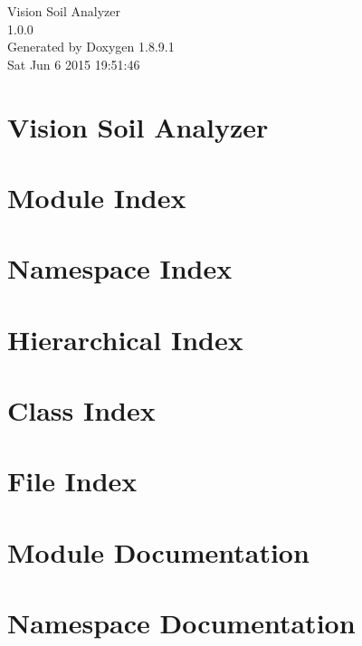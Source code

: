 \documentclass[twoside]{book}
\newcommand{\+}{\discretionary{\mbox{\scriptsize$\hookleftarrow$}}{}{}}
\newcommand{\clearemptydoublepage}{%
  \newpage{\pagestyle{empty}\cleardoublepage}%
}
\begin{document}
\hypersetup{pageanchor=false,
             bookmarks=true,
             bookmarksnumbered=true,
             pdfencoding=unicode
            }
\begin{titlepage}
\vspace*{7cm}
\begin{center}%
{\Large Vision Soil Analyzer \\[1ex]\large 1.\+0.\+0 }\\
\vspace*{1cm}
{\large Generated by Doxygen 1.8.9.1}\\
\vspace*{0.5cm}
{\small Sat Jun 6 2015 19:51:46}\\
\end{center}
\end{titlepage}
\clearemptydoublepage
\tableofcontents
\clearemptydoublepage
{}
\hypersetup{pageanchor=true}

\chapter{Vision Soil Analyzer}
\label{index}\hypertarget{index}{}
\chapter{Module Index}

\chapter{Namespace Index}

\chapter{Hierarchical Index}

\chapter{Class Index}

\chapter{File Index}

\chapter{Module Documentation}

\chapter{Namespace Documentation}












\end{document}
